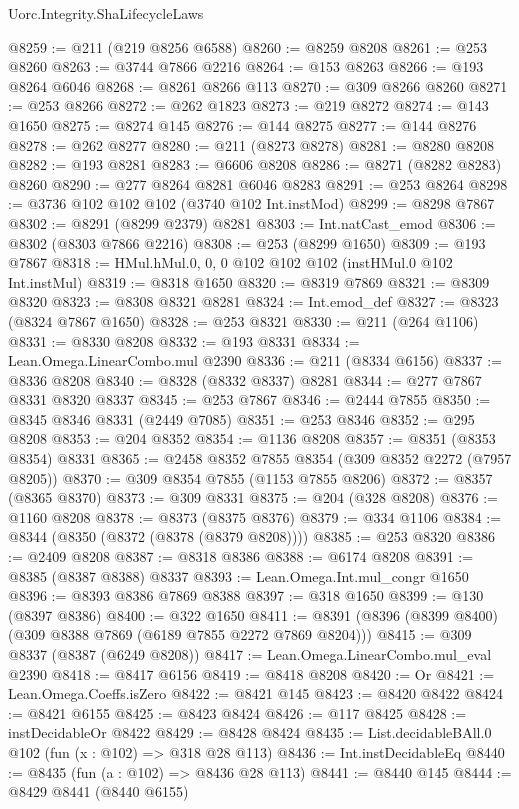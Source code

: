 \begin{lexlean}{Uorc.Integrity.ShaLifecycleLaws}
\begin{coremodule}
@8259 := @211 (@219 @8256 @6588)
@8260 := @8259 @8208
@8261 := @253 @8260
@8263 := @3744 @7866 @2216
@8264 := @153 @8263
@8266 := @193 @8264 @6046
@8268 := @8261 @8266 @113
@8270 := @309 @8266 @8260
@8271 := @253 @8266
@8272 := @262 @1823
@8273 := @219 @8272
@8274 := @143 @1650
@8275 := @8274 @145
@8276 := @144 @8275
@8277 := @144 @8276
@8278 := @262 @8277
@8280 := @211 (@8273 @8278)
@8281 := @8280 @8208
@8282 := @193 @8281
@8283 := @6606 @8208
@8286 := @8271 (@8282 @8283) @8260
@8290 := @277 @8264 @8281 @6046 @8283
@8291 := @253 @8264
@8298 := @3736 @102 @102 @102 (@3740 @102 Int.instMod)
@8299 := @8298 @7867
@8302 := @8291 (@8299 @2379) @8281
@8303 := Int.natCast_emod
@8306 := @8302 (@8303 @7866 @2216)
@8308 := @253 (@8299 @1650)
@8309 := @193 @7867
@8318 := HMul.hMul.{0, 0, 0} @102 @102 @102 (instHMul.{0} @102 Int.instMul)
@8319 := @8318 @1650
@8320 := @8319 @7869
@8321 := @8309 @8320
@8323 := @8308 @8321 @8281
@8324 := Int.emod_def
@8327 := @8323 (@8324 @7867 @1650)
@8328 := @253 @8321
@8330 := @211 (@264 @1106)
@8331 := @8330 @8208
@8332 := @193 @8331
@8334 := Lean.Omega.LinearCombo.mul @2390
@8336 := @211 (@8334 @6156)
@8337 := @8336 @8208
@8340 := @8328 (@8332 @8337) @8281
@8344 := @277 @7867 @8331 @8320 @8337
@8345 := @253 @7867
@8346 := @2444 @7855
@8350 := @8345 @8346 @8331 (@2449 @7085)
@8351 := @253 @8346
@8352 := @295 @8208
@8353 := @204 @8352
@8354 := @1136 @8208
@8357 := @8351 (@8353 @8354) @8331
@8365 := @2458 @8352 @7855 @8354 (@309 @8352 @2272 (@7957 @8205))
@8370 := @309 @8354 @7855 (@1153 @7855 @8206)
@8372 := @8357 (@8365 @8370)
@8373 := @309 @8331
@8375 := @204 (@328 @8208)
@8376 := @1160 @8208
@8378 := @8373 (@8375 @8376)
@8379 := @334 @1106
@8384 := @8344 (@8350 (@8372 (@8378 (@8379 @8208))))
@8385 := @253 @8320
@8386 := @2409 @8208
@8387 := @8318 @8386
@8388 := @6174 @8208
@8391 := @8385 (@8387 @8388) @8337
@8393 := Lean.Omega.Int.mul_congr @1650
@8396 := @8393 @8386 @7869 @8388
@8397 := @318 @1650
@8399 := @130 (@8397 @8386)
@8400 := @322 @1650
@8411 := @8391 (@8396 (@8399 @8400) (@309 @8388 @7869 (@6189 @7855 @2272 @7869 @8204)))
@8415 := @309 @8337 (@8387 (@6249 @8208))
@8417 := Lean.Omega.LinearCombo.mul_eval @2390
@8418 := @8417 @6156
@8419 := @8418 @8208
@8420 := Or
@8421 := Lean.Omega.Coeffs.isZero
@8422 := @8421 @145
@8423 := @8420 @8422
@8424 := @8421 @6155
@8425 := @8423 @8424
@8426 := @117 @8425
@8428 := instDecidableOr @8422
@8429 := @8428 @8424
@8435 := List.decidableBAll.{0} @102 (fun (x : @102) => @318 @28 @113)
@8436 := Int.instDecidableEq
@8440 := @8435 (fun (a : @102) => @8436 @28 @113)
@8441 := @8440 @145
@8444 := @8429 @8441 (@8440 @6155)

\end{coremodule}
\end{lexlean}
